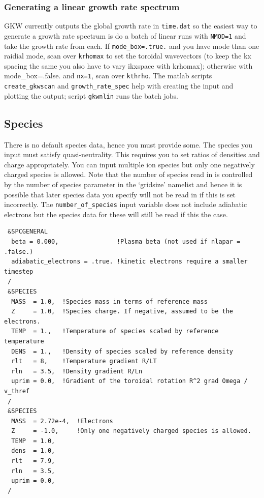 \documentclass{report}
\begin{document}
\subsubsection{Generating a linear growth rate spectrum}
GKW currently outputs the global growth rate in \texttt{time.dat} so the easiest way to generate a growth rate spectrum is do a batch of linear runs with \texttt{NMOD=1} and take the growth rate from each. If \texttt{mode\_box=.true.} and you have mode than one raidial mode, scan over \texttt{krhomax} to set the toroidal wavevectors (to keep the kx spacing the same you also have to vary ikxspace with krhomax); otherwise with {mode\_box=.false.} and \texttt{nx=1}, scan over \texttt{kthrho}.  The matlab scripts \texttt{create\_gkwscan} and \texttt{growth\_rate\_spec} help with creating the input and plotting the output; script \texttt{gkwnlin} runs the batch jobs. 

\subsection{Species}
There is no default species data, hence you must provide some. The species you input must satisfy quasi-neutrality. This requires you to set ratios of densities and charge appropriately.  You can input multiple ion species but only one negatively charged species is allowed.  Note that the number of species read in is controlled by the number of species parameter in the `gridsize' namelist and hence it is possible that later species data you specify will not be read in if this is set incorrectly.  The \texttt{number\_of\_species} input variable does not include adiabatic electrons but the species data for these will still be read if this the case.

\begin{footnotesize}
\begin{verbatim}
 &SPCGENERAL
  beta = 0.000,                !Plasma beta (not used if nlapar = .false.)
  adiabatic_electrons = .true. !kinetic electrons require a smaller timestep
 /
 &SPECIES
  MASS  = 1.0,  !Species mass in terms of reference mass
  Z     = 1.0,  !Species charge. If negative, assumed to be the electrons.
  TEMP  = 1.,   !Temperature of species scaled by reference temperature 
  DENS  = 1.,   !Density of species scaled by reference density 
  rlt   = 8,    !Temperature gradient R/LT
  rln   = 3.5,  !Density gradient R/Ln
  uprim = 0.0,  !Gradient of the toroidal rotation R^2 grad Omega / v_thref
 / 
 &SPECIES 
  MASS  = 2.72e-4,  !Electrons
  Z     = -1.0,     !Only one negatively charged species is allowed.
  TEMP  = 1.0, 
  dens  = 1.0,
  rlt   = 7.9,
  rln   = 3.5, 
  uprim = 0.0,
 /
\end{verbatim}
\end{footnotesize}
\end{document}
